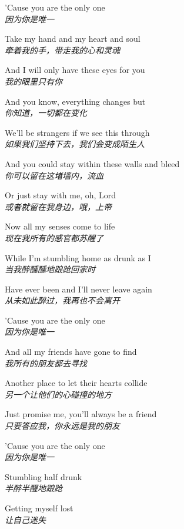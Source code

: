 \begin{spacing}{1.5}
\begin{flushleft}
'Cause you are the only one\\
\textit{因为你是唯一}\lyricspace

Take my hand and my heart and soul\\
\textit{牵着我的手，带走我的心和灵魂}\lyricspace

And I will only have these eyes for you\\
\textit{我的眼里只有你}\lyricspace

And you know, everything changes but\\
\textit{你知道，一切都在变化}\lyricspace

We'll be strangers if we see this through\\
\textit{如果我们坚持下去，我们会变成陌生人}\lyricspace

And you could stay within these walls and bleed\\
\textit{你可以留在这堵墙内，流血}\lyricspace

Or just stay with me, oh, Lord\\
\textit{或者就留在我身边，哦，上帝}\lyricspace

Now all my senses come to life\\
\textit{现在我所有的感官都苏醒了}\lyricspace

While I'm stumbling home as drunk as I\\
\textit{当我醉醺醺地踉跄回家时}\lyricspace

Have ever been and I'll never leave again\\
\textit{从未如此醉过，我再也不会离开}\lyricspace

'Cause you are the only one\\
\textit{因为你是唯一}\lyricspace

And all my friends have gone to find\\
\textit{我所有的朋友都去寻找}\lyricspace

Another place to let their hearts collide\\
\textit{另一个让他们的心碰撞的地方}\lyricspace

Just promise me, you'll always be a friend\\
\textit{只要答应我，你永远是我的朋友}\lyricspace

'Cause you are the only one\\
\textit{因为你是唯一}\lyricspace

Stumbling half drunk\\
\textit{半醉半醒地踉跄}\lyricspace

Getting myself lost\\
\textit{让自己迷失}\lyricspace


\end{flushleft}
\end{spacing}
